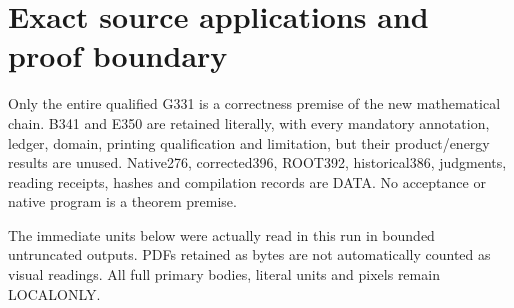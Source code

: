\documentclass[11pt]{article}
\begin{document}
\section{Exact source applications and proof boundary}

Only the entire qualified G331 is a correctness premise of the new mathematical chain. B341 and E350 are retained literally, with every mandatory annotation, ledger, domain, printing qualification and limitation, but their product/energy results are unused. Native276, corrected396, ROOT392, historical386, judgments, reading receipts, hashes and compilation records are DATA. No acceptance or native program is a theorem premise.

The immediate units below were actually read in this run in bounded untruncated outputs. PDFs retained as bytes are not automatically counted as visual readings. All full primary bodies, literal units and pixels remain LOCALONLY.
\end{document}
